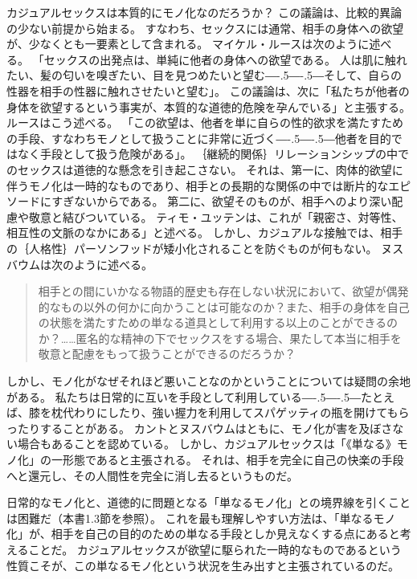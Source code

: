 \documentclass[paper=a4,book,openany]{jlreq}
\def\DDASH{―\kern-.5\zw―\kern-.5\zw―} %
\begin{document}
カジュアルセックスは本質的にモノ化なのだろうか？ この議論は、比較的異論の少ない前提から始まる。
すなわち、セックスには通常、相手の身体への欲望が、少なくとも一要素として含まれる。
マイケル・ルースは次のように述べる。
「セックスの出発点は、単純に他者の身体への欲望である。
人は肌に触れたい、髪の匂いを嗅ぎたい、目を見つめたいと望む{\DDASH}そして、自らの性器を相手の性器に触れさせたいと望む」。
この議論は、次に「私たちが他者の身体を欲望するという事実が、本質的な道徳的危険を孕んでいる」と主張する。
ルースはこう述べる。
「この欲望は、他者を単に自らの性的欲求を満たすための手段、すなわちモノとして扱うことに非常に近づく{\DDASH}他者を目的ではなく手段として扱う危険がある」\citep[p.185]{ruse88:_homos}。
｛継続的関係｝{リレーションシップ}の中でのセックスは道徳的な懸念を引き起こさない。
それは、第一に、肉体的欲望に伴うモノ化は一時的なものであり、相手との長期的な関係の中では断片的なエピソードにすぎないからである。
第二に、欲望そのものが、相手へのより深い配慮や敬意と結びついている。
ティモ・ユッテンは、これが「親密さ、対等性、相互性の文脈のなかにある」と述べる\citep[p.31]{jutten16:_sexual_objec}。
しかし、カジュアルな接触では、相手の｛人格性｝{パーソンフッド}が矮小化されることを防ぐものが何もない。
ヌスバウムは次のように述べる。

\begin{quote}
  相手との間にいかなる物語的歴史も存在しない状況において、欲望が偶発的なもの以外の何かに向かうことは可能なのか？また、相手の身体を自己の状態を満たすための単なる道具として利用する以上のことができるのか？……匿名的な精神の下でセックスをする場合、果たして本当に相手を敬意と配慮をもって扱うことができるのだろうか？\citep[p.287]{nussbaum95:_objec}
\end{quote}

しかし、モノ化がなぜそれほど悪いことなのかということについては疑問の余地がある。
私たちは日常的に互いを手段として利用している{\DDASH}たとえば、膝を枕代わりにしたり、強い握力を利用してスパゲッティの瓶を開けてもらったりすることがある。
カントとヌスバウムはともに、モノ化が害を及ぼさない場合もあることを認めている。
しかし、カジュアルセックスは「《単なる》モノ化」の一形態であると主張される。
それは、相手を完全に自己の快楽の手段へと還元し、その人間性を完全に消し去るというものだ。

日常的なモノ化と、道徳的に問題となる「単なるモノ化」との境界線を引くことは困難だ（本書1.3節を参照）。
これを最も理解しやすい方法は、「単なるモノ化」が、相手を自己の目的のための単なる手段としか見えなくする点にあると考えることだ。
カジュアルセックスが欲望に駆られた一時的なものであるという性質こそが、この単なるモノ化という状況を生み出すと主張されているのだ。
\end{document}

